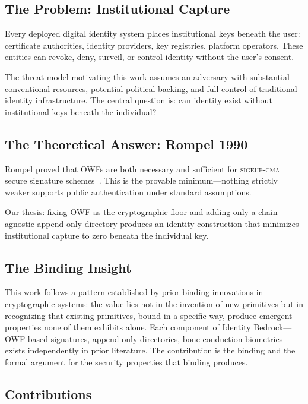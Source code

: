 \documentclass[12pt,a4paper]{article}
\begin{document}
\subsection{The Problem: Institutional Capture}

Every deployed digital identity system places institutional keys beneath
the user: certificate authorities, identity providers, key registries,
platform operators. These entities can revoke, deny, surveil, or control
identity without the user's consent.

The threat model motivating this work assumes an adversary with
substantial conventional resources, potential political backing, and full
control of traditional identity infrastructure. The central question is:
can identity exist without institutional keys beneath the individual?

\subsection{The Theoretical Answer: Rompel 1990}

Rompel proved that OWFs are both necessary and sufficient for
\textsc{sigeuf-cma} secure signature schemes~\cite{Rompel90}. This is
the provable minimum---nothing strictly weaker supports public
authentication under standard assumptions.

Our thesis: fixing OWF as the cryptographic floor and adding only a
chain-agnostic append-only directory produces an identity construction
that minimizes institutional capture to zero beneath the individual key.

\subsection{The Binding Insight}

This work follows a pattern established by prior binding innovations in
cryptographic systems: the value lies not in the invention of new
primitives but in recognizing that existing primitives, bound in a
specific way, produce emergent properties none of them exhibits alone.
Each component of Identity Bedrock---OWF-based signatures, append-only
directories, bone conduction biometrics---exists independently in prior
literature. The contribution is the binding and the formal argument for
the security properties that binding produces.

\subsection{Contributions}
\end{document}
